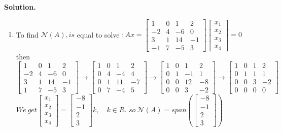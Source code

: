 \documentclass[english,onecolumn]{IEEEtran}
\begin{document}
\noindent\textbf{Solution.}
\begin{enumerate}
    \item To find $\mathcal{N}(A), i s$ equal to solve $: A x=\left[\begin{array}{cccc}1 & 0 & 1 & 2 \\ -2 & 4 & -6 & 0 \\ 3 & 1 & 14 & -1 \\ -1 & 7 & -5 & 3\end{array}\right]\left[\begin{array}{l}x_{1} \\ x_{2} \\ x_{3} \\ x_{4}\end{array}\right]=0$
\\ then $\left[\begin{array}{cccc}1 & 0 & 1 & 2 \\ -2 & 4 & -6 & 0 \\ 3 & 1 & 14 & -1 \\ 1 & 7 & -5 & 3\end{array}\right] \rightarrow\left[\begin{array}{cccc}1 & 0 & 1 & 2 \\ 0 & 4 & -4 & 4 \\ 0 & 1 & 11 & -7 \\ 0 & 7 & -4 & 5\end{array}\right] \rightarrow\left[\begin{array}{cccc}1 & 0 & 1 & 2 \\ 0 & 1 & -1 & 1 \\ 0 & 0 & 12 & -8 \\ 0 & 0 & 3 & -2\end{array}\right] \rightarrow\left[\begin{array}{cccc}1 & 0 & 1 & 2 \\ 0 & 1 & 1 & 1 \\ 0 & 0 & 3 & -2 \\ 0 & 0 & 0 & 0\end{array}\right]$
\\ $W e\ g e t\left[\begin{array}{l}x_{1} \\ x_{2} \\ x_{3} \\ x_{4}\end{array}\right]=\left[\begin{array}{c}-8 \\ -1 \\ 2 \\ 3\end{array}\right] k, \quad k \in R.$
 $so \  \mathcal{N}(A)=span\left( \left[ \begin{array}{c}-8 \\ -1 \\ 2 \\ 3 \end{array}\right] \right)$


\end{enumerate}
\end{document}
